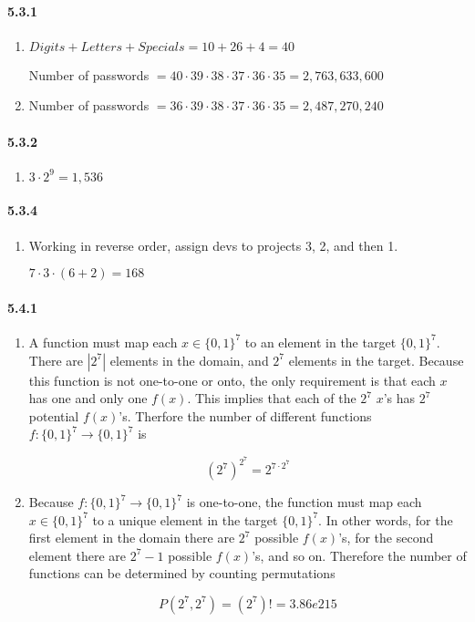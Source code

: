 \documentclass[11pt, letterpaper, twocolumn, fleqn]{article}
\begin{document}
\paragraph{5.3.1}
\begin{enumerate}
  \item $Digits + Letters + Specials = 10 + 26 + 4 = 40$
        
  Number of passwords $= 40 \cdot 39 \cdot 38 \cdot 37 \cdot 36 \cdot 35 = 2,763,633,600$
  \item Number of passwords $= 36 \cdot 39 \cdot 38 \cdot 37 \cdot 36 \cdot 35 = 2,487,270,240$
\end{enumerate}

\paragraph{5.3.2}
\begin{enumerate}
  \item $3 \cdot 2^9 = 1,536$
\end{enumerate}

\paragraph{5.3.4}
\begin{enumerate}
  \item Working in reverse order, assign devs to projects 3, 2, and then 1.
  
  $7 \cdot 3 \cdot (6+2) = 168$
\end{enumerate}

\paragraph{5.4.1}
\begin{enumerate}
  \item A function must map each $x \in \{0,1\}^7$ to an element in the target $\{0,1\}^7$. There are $|2^7|$ elements in the domain, and $2^7$ elements in the target. Because this function is not one-to-one or onto, the only requirement is that each $x$ has one and only one $f(x)$. This implies that each of the $2^7$ $x$'s has $2^7$ potential $f(x)$'s. Therfore the number of different functions $f:\{0,1\}^7 \rightarrow \{0,1\}^7$ is 
  
    $$ \left(2^7 \right)^{2^7} = 2^{7 \cdot 2^7}$$
    
  \item Because $f:\{0,1\}^7 \rightarrow \{0,1\}^7$ is one-to-one, the function must map each $x \in \{0,1\}^7$ to a unique element in the target $\{0,1\}^7$. In other words, for the first element in the domain there are $2^7$ possible $f(x)$'s, for the second element there are $2^7 -1$ possible $f(x)$'s, and so on. Therefore the number of functions can be determined by counting permutations 
  
    $$ P(2^7,2^7) = (2^7)! = 3.86e215$$
\end{enumerate}
\end{document}
